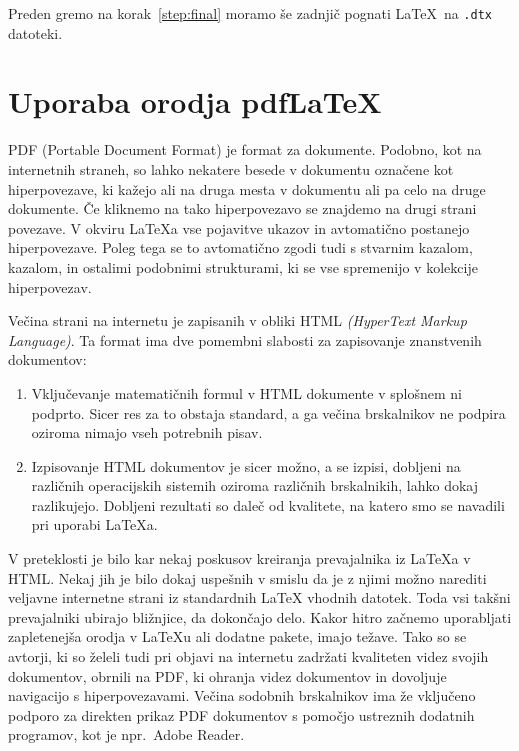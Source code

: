 \noindent Preden gremo na korak~\ref{step:final} moramo še zadnjič pognati 
\LaTeX\ na \texttt{.dtx} datoteki.



\section{Uporaba orodja pdf\LaTeX} \label{sec:pdftex}
%
PDF (Portable Document Format) je  format
za dokumente. Podobno, kot na internetnih straneh, so lahko nekatere
besede v dokumentu označene kot hiperpovezave, ki kažejo ali na 
druga mesta v dokumentu ali pa celo na druge dokumente. Če kliknemo
na tako hiperpovezavo se znajdemo na drugi strani povezave. 
V okviru \LaTeX{}a vse pojavitve ukazov 
 in  avtomatično postanejo hiperpovezave. Poleg tega se
to avtomatično zgodi tudi s stvarnim kazalom, kazalom, in ostalimi
podobnimi strukturami, ki se vse spremenijo v kolekcije hiperpovezav.

Večina strani na internetu je zapisanih v obliki HTML \emph{(HyperText
  Markup Language)}. Ta format ima dve pomembni slabosti za zapisovanje
znanstvenih dokumentov:
\begin{enumerate}
\item Vključevanje matematičnih formul v HTML dokumente v splošnem ni
 podprto. Sicer res za to obstaja standard, a ga večina brskalnikov
 ne podpira oziroma nimajo vseh potrebnih pisav.
\item Izpisovanje HTML dokumentov je sicer možno, a se izpisi, dobljeni na
  različnih operacijskih sistemih oziroma različnih brskalnikih,  lahko
  dokaj  razlikujejo. Dobljeni rezultati so daleč od kvalitete, na katero
  smo se navadili pri uporabi \LaTeX{}a.
\end{enumerate}


V preteklosti je bilo kar nekaj poskusov kreiranja prevajalnika iz 
\LaTeX{}a v HTML. Nekaj jih je bilo dokaj uspešnih v smislu da je
z njimi možno narediti veljavne internetne strani iz standardnih
\LaTeX{} vhodnih datotek. Toda vsi takšni prevajalniki ubirajo bližnjice,
da dokončajo delo. Kakor hitro začnemo uporabljati zapletenejša
orodja v \LaTeX{}u ali dodatne pakete, imajo težave. Tako so se avtorji,
ki so želeli tudi pri objavi na internetu zadržati kvaliteten videz
svojih dokumentov, obrnili na PDF, ki ohranja videz dokumentov in 
dovoljuje navigacijo s hiperpovezavami. Večina sodobnih brskalnikov
ima že vključeno podporo za direkten prikaz PDF dokumentov s pomočjo
ustreznih dodatnih programov, kot je npr.~Adobe Reader.



